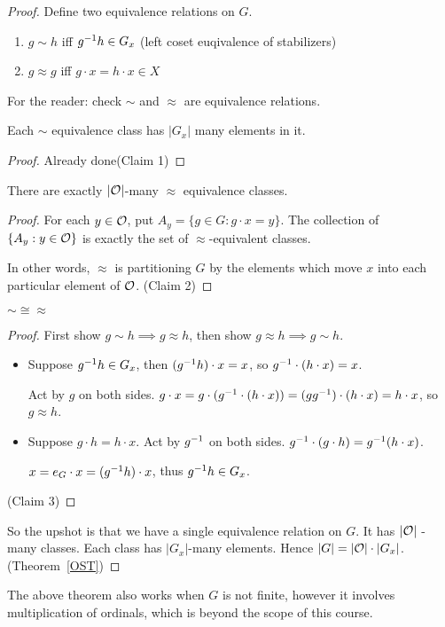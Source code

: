 \documentclass[notes.tex]{subfiles}
\begin{document}
\begin{proof}
	Define two equivalence relations on $G$.
	\begin{enumerate}
		\item $g\sim h$ iff ${g}^{-1}h \in G_x$ (left coset euqivalence of stabilizers)
		\item $g\approx g$ iff $g\cdot x = h\cdot x\in X$
	\end{enumerate}
	For the reader: check $\sim$ and $\approx$ are equivalence relations.

	\begin{claim}[1]
		Each $\sim$ equivalence class has $|G_x|$ many elements in it.
	\end{claim}
	\begin{proof}
		Already done\qedhere(Claim 1)
	\end{proof}
	\begin{claim}[2]
		There are exactly $|\mathcal{O}|$-many $\approx$ equivalence classes.
	\end{claim}
	\begin{proof}
		For each $y\in \mathcal{O}$, put $A_y = \{g\in G: g\cdot x = y\}$.
		The collection of $\{A_y : y\in\mathcal{O}\}$ is exactly  the set of $\approx$-equivalent classes.

		In other words, $\approx$ is partitioning $G$ by the elements which move $x$ into each particular element of $\mathcal{O}$.
		\qedhere(Claim 2)
	\end{proof}
	\begin{claim}[3]
		$\sim \cong \approx$
	\end{claim}
	\begin{proof}
		First show $g\sim h \implies g\approx h$, then show $g\approx h \implies g\sim h$.
		\begin{itemize}
			\item Suppose ${g}^{-1}h\in G_x$, then
				$({g}^{-1}h)\cdot x = x$, so
				${g}^{-1} \cdot (h \cdot x) = x$.

				Act by $g$ on both sides. 
					$g\cdot x = g\cdot ({g}^{-1} \cdot (h \cdot x)) = (g{g}^{-1})\cdot (h\cdot x) = h\cdot x$, so $g\approx h$.
			\item 
			Suppose $g\cdot h = h \cdot x$. Act by ${g}^{-1}$ on both sides. ${g}^{-1} \cdot (g\cdot h) = {g}^{-1} (h\cdot x)$.

			$x = e_G\cdot x = ({g}^{-1}h)\cdot x$, thus ${g}^{-1}h \in G_x$.
		\end{itemize}
		\qedhere(Claim 3)
	\end{proof}
	So the upshot is that we have a single equivalence relation on $G$. It has $|\mathcal{O}|$ -many classes. Each class has $|G_x|$-many elements. Hence $|G| = |\mathcal{O}|\cdot|G_x|$.\qedhere(Theorem~\ref{OST})
\end{proof}

\begin{remark}
	The above theorem also works when $G$ is not finite, however it involves multiplication of ordinals, which is beyond the scope of this course.
\end{remark}
\end{document}
